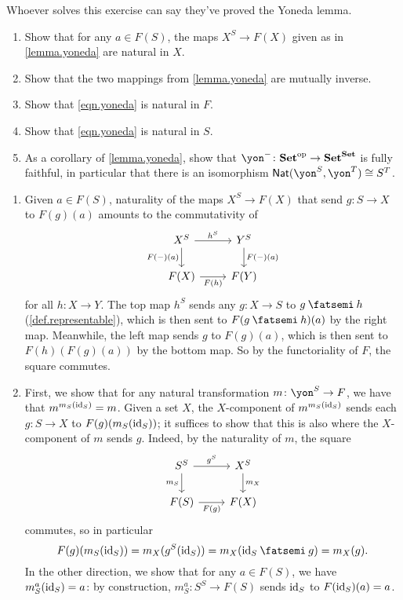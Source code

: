 \documentclass[Book-Poly]{subfiles}
\begin{document}
\begin{exercise}\label{exc.finish_proof_yoneda}
Whoever solves this exercise can say they've proved the Yoneda lemma.
\begin{enumerate}
	\item Show that for any $a\in F(S)$, the maps $X^S\to F(X)$ given as in \cref{lemma.yoneda} are natural in $X$.
	\item Show that the two mappings from \cref{lemma.yoneda} are mutually inverse.
	\item Show that \eqref{eqn.yoneda} is natural in $F$.
	\item Show that \eqref{eqn.yoneda} is natural in $S$.
	\item As a corollary of \cref{lemma.yoneda}, show that $\yon^-\colon\smset\op\to\smset^\smset$ is fully faithful, in particular that there is an isomorphism $\nat(\yon^S,\yon^T)\cong S^T$.
\qedhere
\end{enumerate}

\begin{solution}
\begin{enumerate}
    \item Given $a \in F(S)$, naturality of the maps $X^S \to F(X)$ that send $g \colon S \to X$ to $F(g)(a)$ amounts to the commutativity of
    \[
    \begin{tikzcd}[ampersand replacement=\&]
    	X^S\ar[r, "h^S"]\ar[d, "F(-)(a)"']\&
    	Y^S\ar[d, "F(-)(a)"]\\
    	F(X)\ar[r, "F(h)"']\&
    	F(Y)
    \end{tikzcd}
    \]
    for all $h \colon X \to Y$.
    The top map $h^S$ sends any $g \colon X \to S$ to $g \then h$ (\cref{def.representable}), which is then sent to $F(g \then h)(a)$ by the right map.
    Meanwhile, the left map sends $g$ to $F(g)(a)$, which is then sent to $F(h)(F(g)(a))$ by the bottom map.
    So by the functoriality of $F$, the square commutes.
    
    \item First, we show that for any natural transformation $m \colon \yon^S \to F$, we have that $m^{m_S(\mathrm{id}_S)} = m$.
    Given a set $X$, the $X$-component of $m^{m_S(\mathrm{id}_S)}$ sends each $g \colon S \to X$ to $F(g)(m_S(\mathrm{id}_S))$; it suffices to show that this is also where the $X$-component of $m$ sends $g$.
    Indeed, by the naturality of $m$, the square
    \[
    \begin{tikzcd}[ampersand replacement=\&]
    	S^S\ar[r, "g^S"]\ar[d, "m_S"']\&
    	X^S\ar[d, "m_X"]\\
    	F(S)\ar[r, "F(g)"']\&
    	F(X)
    \end{tikzcd}
    \]
    commutes, so in particular
    \begin{equation} \label{eq.finish_proof_yoneda}
        F(g)(m_S(\id_S)) = m_X(g^S(\id_S)) = m_X(\id_S \then g) = m_X(g).
    \end{equation}
    In the other direction, we show that for any $a \in F(S)$, we have $m^a_S(\mathrm{id}_S) = a$: by construction, $m^a_S \colon S^S \to F(S)$ sends $\mathrm{id}_S$ to $F(\mathrm{id}_S)(a) = a$.
    

\end{enumerate}
\end{solution}
\end{exercise}
\end{document}
